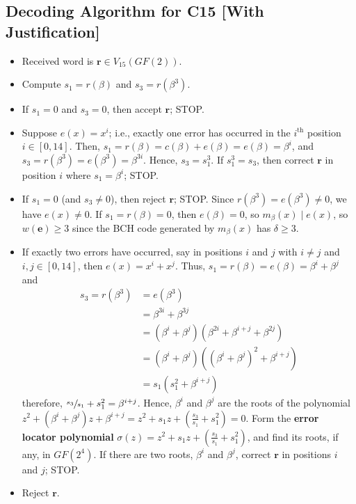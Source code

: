 \subsection*{Decoding Algorithm for C15 [With Justification]}
\begin{itemize}
    \item Received word is $ \symbf{r}\in V_{15}(GF(2)) $.
    \item Compute $ s_1=r(\beta) $ and $ s_3=r(\beta^3) $.
    \item If $ s_1=0 $ and $ s_3=0 $, then accept $ \symbf{r} $; STOP\@.
    \item Suppose $ e(x)=x^i $; i.e., exactly one error has occurred in the $ i^{\text{th}} $
          position $ i\in[0,14] $. Then, $ s_1=r(\beta)=c(\beta)+e(\beta)=e(\beta)=\beta^i $,
          and $ s_3=r(\beta^3)=e(\beta^3)=\beta^{3i} $. Hence, $ s_3=s_1^3 $.
          If $ s_1^3=s_3 $, then correct $ \symbf{r} $ in position $ i $ where $ s_1=\beta^i $;
          STOP\@.
    \item If $ s_1=0 $ (and $ s_3\neq 0 $), then reject $ \symbf{r} $; STOP\@.
          Since $ r(\beta^3)=e(\beta^3)\neq 0 $, we have $ e(x)\neq 0 $. If $ s_1=r(\beta)=0 $,
          then $ e(\beta)=0 $, so $ m_{\beta}(x)\mid e(x) $, so $ w(\symbf{e})\geqslant 3 $
          since the BCH code generated by $ m_{\beta}(x) $ has $ \delta\geqslant 3 $.
    \item If exactly two errors have occurred, say in positions $ i $ and $ j $ with
          $ i\neq j $ and $ i,j\in[0,14] $, then $ e(x)=x^i+x^j $. Thus, $ s_1=r(\beta)=
              e(\beta)=\beta^i+\beta^j $ and
          \begin{align*}
              s_3=r(\beta^3)
               & =e(\beta^3)                                           \\
               & =\beta^{3i}+\beta^{3j}                                \\
               & =(\beta^i+\beta^j)(\beta^{2i}+\beta^{i+j}+\beta^{2j}) \\
               & =(\beta^i+\beta^j)((\beta^i+\beta^j)^2+\beta^{i+j})   \\
               & =s_1(s_1^2+\beta^{i+j})
          \end{align*}
          therefore, $ \sfrac{s_3}{s_1}+s_1^2=\beta^{i+j} $. Hence, $ \beta^i $
          and $ \beta^j $ are the roots of the polynomial $ z^2+(\beta^i+\beta^j)z+\beta^{i+j}=
              z^2+s_1z+\left( \frac{s_3}{s_1} +s_1^2 \right)=0 $. Form the
          \textbf{error locator polynomial}
          $ \sigma(z)=z^2+s_1z+\left( \frac{s_3}{s_1} +s_1^2 \right) $, and find its
          roots, if any, in $ GF(2^4) $. If there are two roots, $ \beta^i $
          and $ \beta^j $, correct $ \symbf{r} $ in positions $ i $ and $ j $; STOP\@.
    \item Reject $ \symbf{r} $.
\end{itemize}

